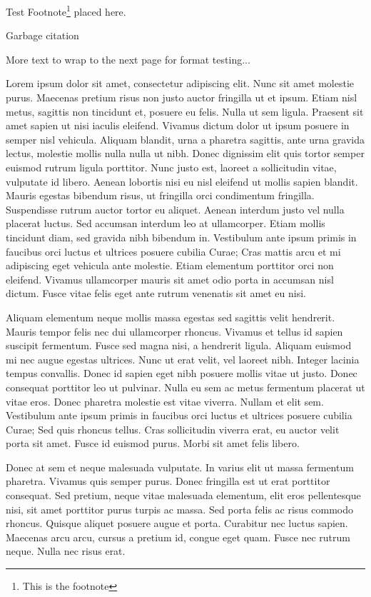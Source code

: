 
Test Footnote\footnote{This is the footnote} placed here.

Garbage citation\cite{MEtherton2006}

More text to wrap to the next page for format testing...

Lorem ipsum dolor sit amet, consectetur adipiscing elit. Nunc sit amet molestie purus. Maecenas pretium risus non justo auctor fringilla ut et ipsum. Etiam nisl metus, sagittis non tincidunt et, posuere eu felis. Nulla ut sem ligula. Praesent sit amet sapien ut nisi iaculis eleifend. Vivamus dictum dolor ut ipsum posuere in semper nisl vehicula. Aliquam blandit, urna a pharetra sagittis, ante urna gravida lectus, molestie mollis nulla nulla ut nibh. Donec dignissim elit quis tortor semper euismod rutrum ligula porttitor. Nunc justo est, laoreet a sollicitudin vitae, vulputate id libero. Aenean lobortis nisi eu nisl eleifend ut mollis sapien blandit. Mauris egestas bibendum risus, ut fringilla orci condimentum fringilla. Suspendisse rutrum auctor tortor eu aliquet. Aenean interdum justo vel nulla placerat luctus. Sed accumsan interdum leo at ullamcorper. Etiam mollis tincidunt diam, sed gravida nibh bibendum in. Vestibulum ante ipsum primis in faucibus orci luctus et ultrices posuere cubilia Curae; Cras mattis arcu et mi adipiscing eget vehicula ante molestie. Etiam elementum porttitor orci non eleifend. Vivamus ullamcorper mauris sit amet odio porta in accumsan nisl dictum. Fusce vitae felis eget ante rutrum venenatis sit amet eu nisi.

Aliquam elementum neque mollis massa egestas sed sagittis velit hendrerit. Mauris tempor felis nec dui ullamcorper rhoncus. Vivamus et tellus id sapien suscipit fermentum. Fusce sed magna nisi, a hendrerit ligula. Aliquam euismod mi nec augue egestas ultrices. Nunc ut erat velit, vel laoreet nibh. Integer lacinia tempus convallis. Donec id sapien eget nibh posuere mollis vitae ut justo. Donec consequat porttitor leo ut pulvinar. Nulla eu sem ac metus fermentum placerat ut vitae eros. Donec pharetra molestie est vitae viverra. Nullam et elit sem. Vestibulum ante ipsum primis in faucibus orci luctus et ultrices posuere cubilia Curae; Sed quis rhoncus tellus. Cras sollicitudin viverra erat, eu auctor velit porta sit amet. Fusce id euismod purus. Morbi sit amet felis libero.

Donec at sem et neque malesuada vulputate. In varius elit ut massa fermentum pharetra. Vivamus quis semper purus. Donec fringilla est ut erat porttitor consequat. Sed pretium, neque vitae malesuada elementum, elit eros pellentesque nisi, sit amet porttitor purus turpis ac massa. Sed porta felis ac risus commodo rhoncus. Quisque aliquet posuere augue et porta. Curabitur nec luctus sapien. Maecenas arcu arcu, cursus a pretium id, congue eget quam. Fusce nec rutrum neque. Nulla nec risus erat.

